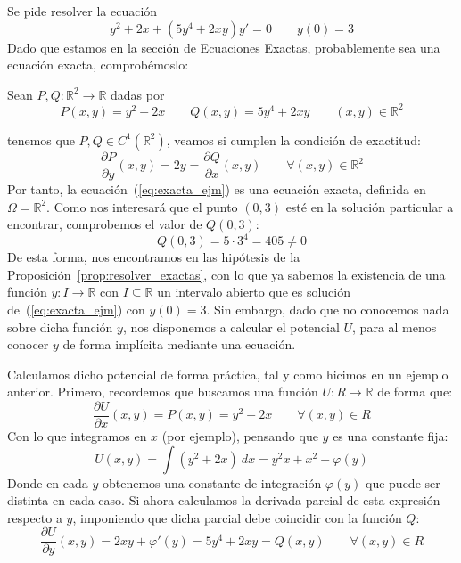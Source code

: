 
\begin{ejemplo}
    Se pide resolver la ecuación
    \begin{equation}\label{eq:exacta_ejm}
        y^2 + 2x+(5y^4 + 2xy)y' = 0 \qquad y(0) = 3
    \end{equation}
    Dado que estamos en la sección de Ecuaciones Exactas, probablemente sea una ecuación exacta, comprobémoslo:

    Sean $P,Q:\mathbb{R}^2\rightarrow\mathbb{R}$ dadas por
    \begin{equation*}
        P(x,y) = y^2 + 2x \qquad Q(x,y) = 5y^4 + 2xy \qquad (x,y)\in \mathbb{R}^2
    \end{equation*}

    tenemos que $P,Q\in C^1(\mathbb{R}^2)$, veamos si cumplen la condición de exactitud:
    \begin{equation*}
        \dfrac{\partial P}{\partial y}(x,y) = 2y = \dfrac{\partial Q}{\partial x}(x,y) \qquad \forall (x,y)\in \mathbb{R}^2
    \end{equation*}
    Por tanto, la ecuación~(\ref{eq:exacta_ejm}) es una ecuación exacta, definida en $\Omega=\mathbb{R}^2$. Como nos interesará que el punto $(0,3)$ esté en la solución particular a encontrar, comprobemos el valor de $Q(0,3)$:
    \begin{equation*}
        Q(0,3) = 5\cdot 3^4 = 405 \neq 0
    \end{equation*}
    De esta forma, nos encontramos en las hipótesis de la Proposición~\ref{prop:resolver_exactas}, con lo que ya sabemos la existencia de una función $y:I\rightarrow\mathbb{R}$ con $I\subseteq \mathbb{R}$ un intervalo abierto que es solución de~(\ref{eq:exacta_ejm}) con $y(0)=3$. Sin embargo, dado que no conocemos nada sobre dicha función $y$, nos disponemos a calcular el potencial $U$, para al menos conocer $y$ de forma implícita mediante una ecuación.

    Calculamos dicho potencial de forma práctica, tal y como hicimos en un ejemplo anterior. Primero, recordemos que buscamos una función $U:R\rightarrow\mathbb{R}$ de forma que:
    \begin{equation*}
        \dfrac{\partial U}{\partial x}(x,y) = P(x,y) =  y^2 + 2x \qquad \forall (x,y)\in R
    \end{equation*}
    Con lo que integramos en $x$ (por ejemplo), pensando que $y$ es una constante fija:
    \begin{equation*}
        U(x,y) = \int (y^2 + 2x)~dx  = y^2 x + x^2 + \varphi(y)
    \end{equation*}
    Donde en cada $y$ obtenemos una constante de integración $\varphi(y)$ que puede ser distinta en cada caso. Si ahora calculamos la derivada parcial de esta expresión respecto a $y$, imponiendo que dicha parcial debe coincidir con la función $Q$:
    \begin{equation*}
        \dfrac{\partial U}{\partial y}(x,y) = 2xy + \varphi'(y) = 5y^4 + 2xy = Q(x,y) \qquad \forall (x,y)\in R
    \end{equation*}


\end{ejemplo}
